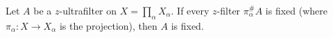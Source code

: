 Let \(A\) be a \(z\)-ultrafilter on \(X = \prod_{\alpha} X_{\alpha}\). If every \(z\)-filter \(\pi_{\alpha}^\# A\) is fixed (where \(\pi_{\alpha} : X \to X_{\alpha}\) is the projection), then \(A\) is fixed.
